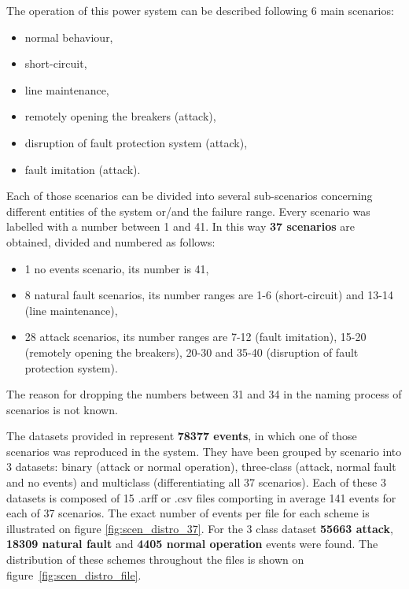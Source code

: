The operation of this power system can be described following 6 main scenarios:
\begin{itemize}
    \item normal behaviour, 
    \item short-circuit,
    \item line maintenance,
    \item remotely opening the breakers (attack),
    \item disruption of fault protection system (attack),
    \item fault imitation (attack).
\end{itemize} 
Each of those scenarios can be divided into several sub-scenarios concerning different entities of the system or/and the failure range. Every scenario was labelled with a number between 1 and 41. In this way \textbf{37 scenarios} are obtained, divided and numbered as follows:
\begin{itemize}
    \item 1 no events scenario, its number is 41,
    \item 8 natural fault scenarios, its number ranges are 1-6 (short-circuit) and 13-14 (line maintenance),
    \item 28 attack scenarios, its number ranges are 7-12 (fault imitation), 15-20 (remotely opening the breakers), 20-30 and 35-40 (disruption of fault protection system).
\end{itemize}
The reason for dropping the numbers between 31 and 34 in the naming process of scenarios is not known.

The datasets provided in \cite{morris_industrial_nodate} represent \textbf{78377 events}, in which one of those scenarios was reproduced in the system. They have been grouped by scenario into 3 datasets: binary (attack or normal operation), three-class (attack, normal fault and no events) and multiclass (differentiating all 37 scenarios). Each of these 3 datasets is composed of 15 .arff or .csv files comporting in average 141 events for each of 37 scenarios. The exact number of events per file for each scheme is illustrated on figure \ref{fig:scen_distro_37}. For the 3 class dataset \textbf{55663 attack}, \textbf{18309 natural fault} and \textbf{4405 normal operation} events were found. The distribution of these schemes throughout the files is shown on figure~\ref{fig:scen_distro_file}. 

